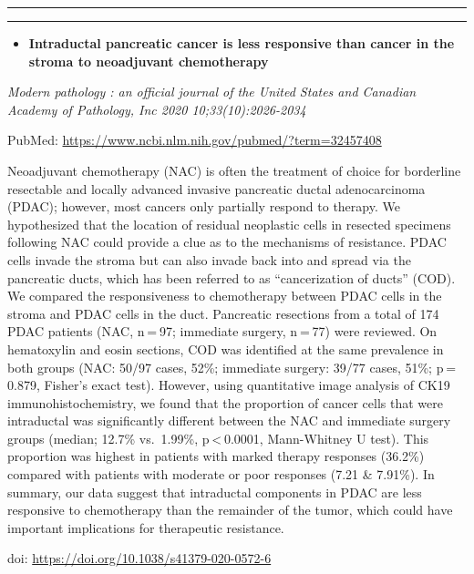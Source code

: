 \documentclass[
]{article}
\providecommand{\tightlist}{%
  \setlength{\itemsep}{0pt}\setlength{\parskip}{0pt}}
\begin{document}
\begin{center}\rule{0.5\linewidth}{0.5pt}\end{center}

\begin{center}\rule{0.5\linewidth}{0.5pt}\end{center}

\begin{itemize}
\tightlist
\item
  \textbf{Intraductal pancreatic cancer is less responsive than cancer
  in the stroma to neoadjuvant chemotherapy}
\end{itemize}

\emph{Modern pathology : an official journal of the United States and
Canadian Academy of Pathology, Inc 2020 10;33(10):2026-2034}

PubMed: \url{https://www.ncbi.nlm.nih.gov/pubmed/?term=32457408}

Neoadjuvant chemotherapy (NAC) is often the treatment of choice for
borderline resectable and locally advanced invasive pancreatic ductal
adenocarcinoma (PDAC); however, most cancers only partially respond to
therapy. We hypothesized that the location of residual neoplastic cells
in resected specimens following NAC could provide a clue as to the
mechanisms of resistance. PDAC cells invade the stroma but can also
invade back into and spread via the pancreatic ducts, which has been
referred to as ``cancerization of ducts'' (COD). We compared the
responsiveness to chemotherapy between PDAC cells in the stroma and PDAC
cells in the duct. Pancreatic resections from a total of 174 PDAC
patients (NAC, n = 97; immediate surgery, n = 77) were reviewed. On
hematoxylin and eosin sections, COD was identified at the same
prevalence in both groups (NAC: 50/97 cases, 52\%; immediate surgery:
39/77 cases, 51\%; p = 0.879, Fisher's exact test). However, using
quantitative image analysis of CK19 immunohistochemistry, we found that
the proportion of cancer cells that were intraductal was significantly
different between the NAC and immediate surgery groups (median; 12.7\%
vs.~1.99\%, p \textless{} 0.0001, Mann-Whitney U test). This proportion
was highest in patients with marked therapy responses (36.2\%) compared
with patients with moderate or poor responses (7.21 \& 7.91\%). In
summary, our data suggest that intraductal components in PDAC are less
responsive to chemotherapy than the remainder of the tumor, which could
have important implications for therapeutic resistance.

doi: \url{https://doi.org/10.1038/s41379-020-0572-6}
\end{document}
